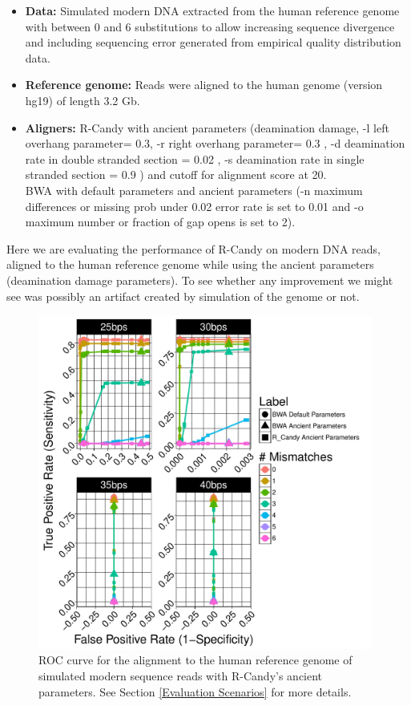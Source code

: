 \documentclass[11pt,a4paper]{report}
\begin{document}
\label{ Alignment of Simulated Modern DNA Reads to a the Human Reference Genome.}


 \begin{itemize}
 
   \item \textbf{Data:} Simulated modern DNA extracted from the human reference genome 
   with between 0 and 6 substitutions to allow increasing sequence divergence
   and including sequencing error generated from empirical quality distribution
   data.
   
   \item \textbf{Reference genome:} Reads were aligned to the human genome 
   (version hg19) of length 3.2 Gb.

    \item \textbf{Aligners:}
    R-Candy with ancient parameters 
  	(deamination damage, -l left overhang parameter= 0.3, -r right overhang parameter= 0.3 , 
	-d deamination rate in double stranded section = 0.02 , 
	-s deamination rate in single stranded section = 0.9 )
  	and cutoff for alignment score at 20. \\
  	BWA with default parameters and ancient parameters \cite{green2010draft}
	(-n maximum differences or missing prob under 0.02 error rate is set to 0.01 
     and -o maximum number or fraction of gap opens is set to 2)\cite{green2010draft}.
   
 \end{itemize}
	
	
Here we are evaluating the performance of R-Candy on modern DNA reads, 
aligned to the human reference genome while using the ancient parameters
(deamination damage parameters).
To see whether any improvement we might see was possibly an artifact
created by simulation of the genome or not.

\begin{figure}[H]
\centering
\includegraphics[width=11cm]{pictures/f_DS9_22_20_54_emp.pdf}
\caption{ 
ROC curve for the alignment to the human reference genome of simulated 
modern sequence reads with R-Candy's ancient parameters. See Section 
\ref{Evaluation 
Scenarios} for more details.
}
\label{DS9_emp}
\end{figure}
 
\end{document}

